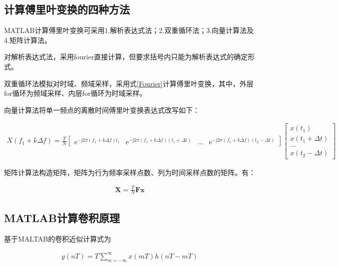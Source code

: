 \documentclass[12pt]{article}
\begin{document}
\subsection{计算傅里叶变换的四种方法}
MATLAB计算傅里叶变换可采用1.解析表达式法；2.双重循环法；3.向量计算法及4.矩阵计算法。

对解析表达式法，采用fourier\(\)直接计算，但要求括号内只能为解析表达式的确定形式。

双重循环法模拟对时域、频域采样，采用式\ref{Fourier}计算傅里叶变换，其中，外层for循环为频域采样、内层for循环为时域采样。

向量计算法将单一频点的离散时间傅里叶变换表达式改写如下：

\begin{center}
     {\setlength\abovedisplayskip{-0.8cm}
       \setlength\belowdisplayskip{-0.8cm}
    \begin{equation}
        \begin{aligned}
          X(f_1+k\Delta f)=\frac{T}{N}
\begin{bmatrix}
 \mathrm{e}^{-\mathrm{j}2\pi (f_1+k\Delta f)t_1} &\mathrm{e}^{-\mathrm{j}2\pi (f_1+k\Delta f)(t_1 +\Delta t)}  & ... &\mathrm{e}^{-\mathrm{j}2\pi (f_1+k\Delta f)(t_2 -\Delta t)}
  \end{bmatrix}
 \begin{bmatrix}
  x(t_1)\\
  x(t_1+\Delta t)\\
  ...\\
  x(t_2-\Delta t)
\end{bmatrix}  
        \end{aligned}
    \end{equation}
    }
    \label{Fourier_vector}
\end{center}


矩阵计算法构造矩阵，矩阵为行为频率采样点数、列为时间采样点数的矩阵。有：
\begin{center}
     {\setlength\abovedisplayskip{-0.8cm}
      \setlength\belowdisplayskip{-0.8cm}
    \begin{equation}
        \begin{aligned}
        \mathbf{X}=\frac{T}{N}\mathbf{F}\mathbf{x}
        \end{aligned}
    \end{equation}
    }
    \label{matrix_Fourier}
\end{center}

\subsection{MATLAB计算卷积原理}
基于MALTAB的卷积近似计算式为
\begin{center}
     {\setlength\abovedisplayskip{-0.6cm}
       \setlength\belowdisplayskip{-0.8cm}
\begin{equation}
    \begin{aligned}
y(nT)=T\sum_{m=-\infty}^{\infty}x(mT)h(nT-mT)
    \end{aligned}
\end{equation}    
}
\label{conv}
\end{center}
\end{document}
